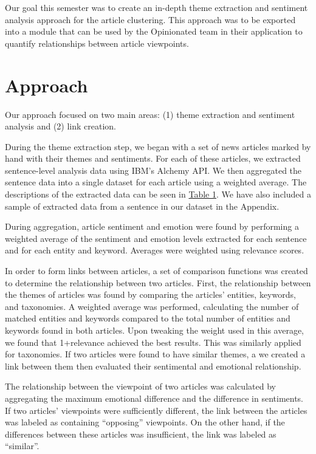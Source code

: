 \documentclass[12pt]{article}
\begin{document}
Our goal this semester was to create an in-depth theme extraction and sentiment analysis approach for the article clustering. This approach was to be exported into a module that can be used by the Opinionated team in their application to quantify relationships between article viewpoints.

\section{Approach}
Our approach focused on two main areas: (1) theme extraction and sentiment analysis and (2) link creation.

During the theme extraction step, we began with a set of news articles marked by hand with their themes and sentiments. For each of these articles, we extracted sentence-level analysis data using IBM's Alchemy API. We then aggregated the sentence data into a single dataset for each article using a weighted average. The descriptions of the extracted data can be seen in \hyperref[table:features]{Table 1}. We have also included a sample of extracted data from a sentence in our dataset in the Appendix.

During aggregation, article sentiment and emotion were found by performing a weighted average of the sentiment and emotion levels extracted for each sentence and for each entity and keyword. Averages were weighted using relevance scores.

In order to form links between articles, a set of comparison functions was created to determine the relationship between two articles. First, the relationship between the themes of articles was found by comparing the articles' entities, keywords, and taxonomies. A weighted average was performed, calculating the number of matched entities and keywords compared to the total number of entities and keywords found in both articles. Upon tweaking the weight used in this average, we found that 1+relevance achieved the best results. This was similarly applied for taxonomies. If two articles were found to have similar themes, a we created a link between them then evaluated their sentimental and emotional relationship.

The relationship between the viewpoint of two articles was calculated by aggregating the maximum emotional difference and the difference in sentiments. If two articles' viewpoints were sufficiently different, the link between the articles was labeled as containing ``opposing'' viewpoints. On the other hand, if the differences between these articles was insufficient, the link was labeled as ``similar''.
\end{document}
